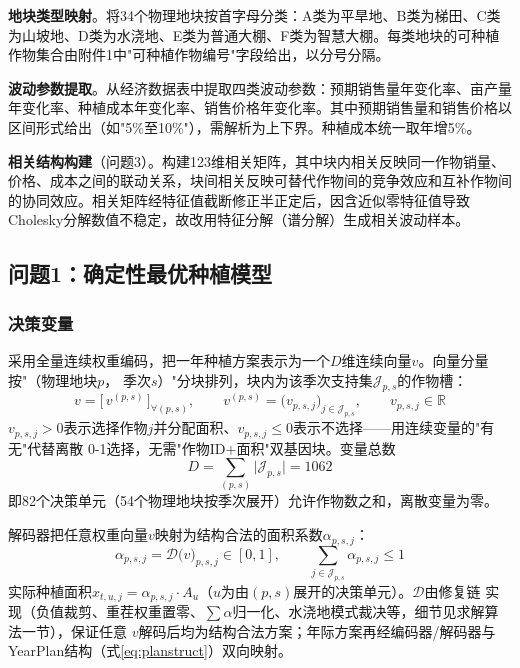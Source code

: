 \documentclass[12pt,a4paper]{article}
\begin{document}
\textbf{地块类型映射}。将34个物理地块按首字母分类：A类为平旱地、B类为梯田、C类为山坡地、D类为水浇地、E类为普通大棚、F类为智慧大棚。每类地块的可种植作物集合由附件1中"可种植作物编号"字段给出，以分号分隔。

\textbf{波动参数提取}。从经济数据表中提取四类波动参数：预期销售量年变化率、亩产量年变化率、种植成本年变化率、销售价格年变化率。其中预期销售量和销售价格以区间形式给出（如"5\%至10\%"），需解析为上下界。种植成本统一取年增5\%。

\textbf{相关结构构建}（问题3）。构建123维相关矩阵，其中块内相关反映同一作物销量、价格、成本之间的联动关系，块间相关反映可替代作物间的竞争效应和互补作物间的协同效应。相关矩阵经特征值截断修正半正定后，因含近似零特征值导致Cholesky分解数值不稳定，故改用特征分解（谱分解）生成相关波动样本。

\subsection{问题1：确定性最优种植模型}

\subsubsection{决策变量}

采用全量连续权重编码，把一年种植方案表示为一个$D$维连续向量$v$。向量分量按"（物理地块$p$，
季次$s$）"分块排列，块内为该季次支持集$\mathcal{J}_{p,s}$的作物槽：
\begin{equation}
v=\big[\,v^{(p,s)}\,\big]_{\forall(p,s)},\qquad
v^{(p,s)}=\big(v_{p,s,j}\big)_{j\in\mathcal{J}_{p,s}},\qquad
v_{p,s,j}\in\mathbb{R}
\label{eq:code}
\end{equation}
$v_{p,s,j}>0$表示选择作物$j$并分配面积、$v_{p,s,j}\le0$表示不选择——用连续变量的"有无"代替离散
0-1选择，无需"作物ID+面积"双基因块。变量总数
\begin{equation}
D=\sum_{(p,s)}\big|\mathcal{J}_{p,s}\big|=1062
\label{eq:dim}
\end{equation}
即82个决策单元（54个物理地块按季次展开）允许作物数之和，离散变量为零。

解码器把任意权重向量$v$映射为结构合法的面积系数$\alpha_{p,s,j}$：
\begin{equation}
\alpha_{p,s,j}=\mathcal{D}\big(v\big)_{p,s,j}\in[0,1],\qquad
\sum_{j\in\mathcal{J}_{p,s}}\alpha_{p,s,j}\le1
\label{eq:decode}
\end{equation}
实际种植面积$x_{t,u,j}=\alpha_{p,s,j}\cdot A_u$（$u$为由$(p,s)$展开的决策单元）。$\mathcal{D}$由修复链
实现（负值裁剪、重茬权重置零、$\sum\alpha$归一化、水浇地模式裁决等，细节见求解算法一节），保证任意
$v$解码后均为结构合法方案；年际方案再经编码器/解码器与YearPlan结构（式\eqref{eq:planstruct}）双向映射。
\end{document}
